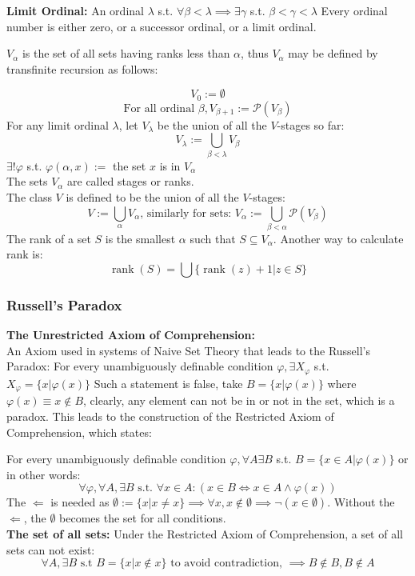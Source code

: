 \documentclass{article}
\newcommand{\0}{{\bf{0}}}
\begin{document}
\textbf{Limit Ordinal:} An ordinal $\lambda$ s.t. $\forall\beta<\lambda\implies\exists\gamma$ s.t. $\beta<\gamma<\lambda$ Every ordinal number is either zero, or a successor ordinal, or a limit ordinal.

$V_{\alpha}$ is the set of all sets having ranks less than $\alpha$, thus $V_{\alpha}$ may be defined by transfinite recursion as follows:

$$V_0:=\emptyset$$
$$\mbox{For all ordinal }\beta,V_{\beta+1}:=\mathcal{P}(V_{\beta })$$
For any limit ordinal $\lambda$, let $V_\lambda$ be the union of all the $V$-stages so far:
$$V_\lambda:=\bigcup_{\beta<\lambda}V_{\beta }$$
$\exists!\varphi$ s.t. $\varphi(\alpha,x):=$ the set $x$ is in $V_\alpha$\\
The sets $V_\alpha$ are called stages or ranks.\\
The class $V$ is defined to be the union of all the $V$-stages:
$$V:=\bigcup_\alpha V_\alpha\mbox{, similarly for sets: }V_{\alpha }:=\bigcup _{\beta <\alpha }{\mathcal {P}}(V_{\beta })$$
The rank of a set $S$ is the smallest $\alpha$ such that $S\subseteq V_\alpha$. Another way to calculate rank is:
$$\operatorname{rank}(S)=\bigcup\{\operatorname{rank}(z)+1|z\in S\}$$
\subsubsection{Russell's Paradox}
{\textbf{The Unrestricted Axiom of Comprehension:}}\\
An Axiom used in systems of Naive Set Theory that leads to the Russell's Paradox:
For every unambiguously definable condition $\varphi,\exists{}X_{\varphi}$ s.t. $X_{\varphi}=\{x|\varphi(x)\}$
Such a statement is false, take $B=\{x|\varphi(x)\}$ where $\varphi(x)\equiv{}x\notin{}B$, clearly, any element can not be in or not in the set, which is a paradox.
This leads to the construction of the Restricted Axiom of Comprehension, which states:

For every unambiguously definable condition $\varphi,\forall{}A\exists{}B$ s.t. $B=\{x\in{}A|\varphi(x)\}$ or in other words:
$$\forall\varphi,\forall{}A,\exists{}B\mbox{ s.t. }\forall{}x\in{}A:(x\in{}B\iff{}x\in{}A\land\varphi(x))$$
The $\Longleftarrow$ is needed as $\emptyset:=\{x|x\neq{}x\}\implies\forall{}x,x\notin\emptyset\implies{}\neg(x\in\emptyset)$. Without the $\Longleftarrow$, the $\emptyset$ becomes the set for all conditions.\\
{\textbf{The set of all sets:}}
Under the Restricted Axiom of Comprehension, a set of all sets can not exist:
$$\forall{}A,\exists{}B\mbox{ s.t }B=\{x|x\notin{x}\}\mbox{ to avoid contradiction, }\implies{}B\notin{}B,B\notin{}A$$
\end{document}
